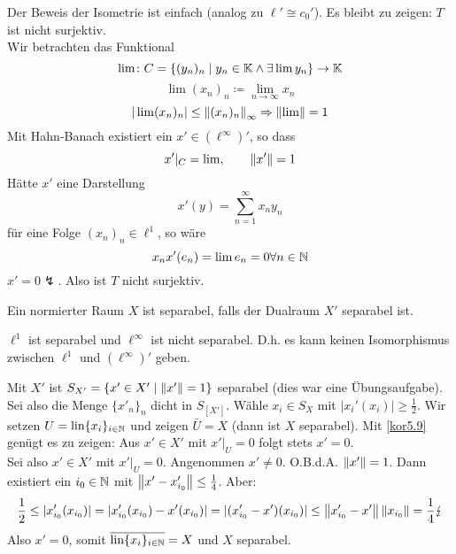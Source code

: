 \begin{beweis}
	Der Beweis der Isometrie ist einfach (analog zu $ \ell'\cong c_0' $). Es bleibt zu zeigen: $ T $ ist nicht surjektiv.\\
	Wir betrachten das Funktional
	\[ \lim\colon C=\lbrace (y_n)_n\mid y_n\in\mathbb{K}\wedge\exists\lim y_n\rbrace\rightarrow\mathbb{K} \]
	\[ \lim (x_n)_n\coloneqq\lim_{n\to\infty}x_n \]
	\[ |\lim(x_n)_n|\leq\left\|(x_n)_n\right\|_\infty\Rightarrow\left\|\lim\right\|=1 \]
	Mit Hahn-Banach existiert ein $ x'\in(\ell^\infty)' $, so dass
	\[ x'|_C=\lim,\qquad \left\|x'\right\|=1 \]
	H\"atte $ x' $ eine Darstellung
	\[ x'(y)=\sum_{n=1}^{\infty}x_ny_n \]
	f\"ur eine Folge $ (x_n)_n\in\ell^1 $, so w\"are 
	\[ x_nx'(e_n)=\lim e_n=0\forall n\in\mathbb{N} \]
	$ x'=0\lightning $. Also ist $ T $ nicht surjektiv.
\end{beweis}
\begin{satz}
	Ein normierter Raum $ X $ ist separabel, falls der Dualraum $ X' $ separabel ist.
\end{satz}
\begin{bemerkung*}
	$ \ell^1 $ ist separabel und $ \ell^\infty $ ist nicht separabel. D.h. es kann keinen Isomorphismus zwischen $ \ell^1 $ und $ (\ell^\infty)' $ geben.
\end{bemerkung*}
\begin{beweis}
	Mit $ X' $ ist $ S_{X'}=\lbrace x'\in X'\mid\left\|x'\right\|=1\rbrace $ separabel (dies war eine \"Ubungsaufgabe). Sei also die Menge $ \lbrace x'_n\rbrace_n $ dicht in $ S_[X'] $. W\"ahle $ x_i\in S_X $ mit $ |x_i'(x_i)|\geq\frac{1}{2} $. Wir setzen $ U=\text{lin}\lbrace x_i\rbrace_{i\in\mathbb{N}} $  und zeigen $ \bar U=X $ (dann ist $ X $ separabel). Mit \ref{kor5.9} gen\"ugt es zu zeigen: Aus $ x'\in X' $ mit $ x'|_U=0 $ folgt stets $ x'=0 $.\\
	Sei also $ x'\in X' $ mit $ x'|_U=0 $. Angenommen $ x'\neq 0 $. O.B.d.A. $ \left\|x'\right\|=1 $. Dann existiert ein $ i_0\in\mathbb{N} $ mit $ \left\|x'-x'_{i_0}\right\|\leq\frac{1}{4} $.
	Aber:
	\[ \frac{1}{2}\leq|x_{i_0}'(x_{i_0})|=|x_{i_0}'(x_{i_0})-x'(x_{i_0})|=|(x_{i_0}'-x')(x_{i_0})|\leq\left\|x_{i_0}'-x'\right\|\left\|x_{i_0}\right\|=\frac{1}{4}\lightning \] 
	Also $ x'=0 $, somit $ \overline{\text{lin}\lbrace x_i\rbrace_{i\in\mathbb{N}}}=X $ und $ X $ separabel.
\end{beweis}
